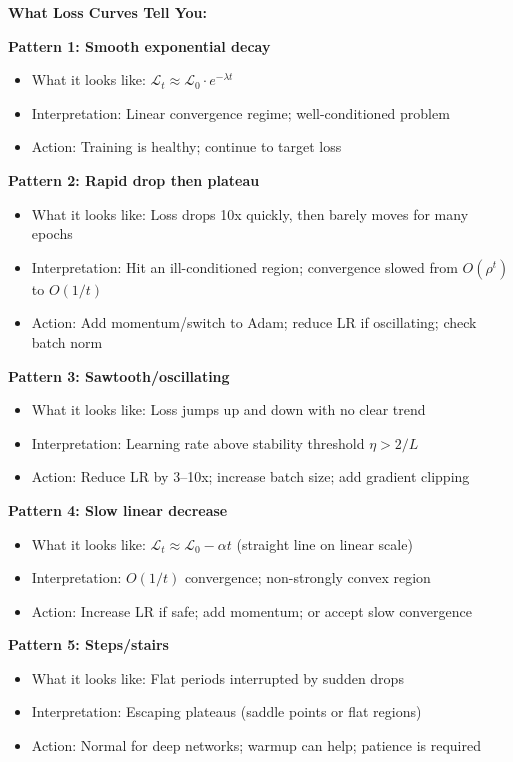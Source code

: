 \documentclass[../../main.tex]{subfiles}
\begin{document}
\begin{important}
\textbf{What Loss Curves Tell You:}

\textbf{Pattern 1: Smooth exponential decay}
\begin{itemize}
    \item What it looks like: $\mathcal{L}_t \approx \mathcal{L}_0 \cdot e^{-\lambda t}$
    \item Interpretation: Linear convergence regime; well-conditioned problem
    \item Action: Training is healthy; continue to target loss
\end{itemize}

\textbf{Pattern 2: Rapid drop then plateau}
\begin{itemize}
    \item What it looks like: Loss drops 10x quickly, then barely moves for many epochs
    \item Interpretation: Hit an ill-conditioned region; convergence slowed from $O(\rho^t)$ to $O(1/t)$
    \item Action: Add momentum/switch to Adam; reduce LR if oscillating; check batch norm
\end{itemize}

\textbf{Pattern 3: Sawtooth/oscillating}
\begin{itemize}
    \item What it looks like: Loss jumps up and down with no clear trend
    \item Interpretation: Learning rate above stability threshold $\eta > 2/L$
    \item Action: Reduce LR by 3--10x; increase batch size; add gradient clipping
\end{itemize}

\textbf{Pattern 4: Slow linear decrease}
\begin{itemize}
    \item What it looks like: $\mathcal{L}_t \approx \mathcal{L}_0 - \alpha t$ (straight line on linear scale)
    \item Interpretation: $O(1/t)$ convergence; non-strongly convex region
    \item Action: Increase LR if safe; add momentum; or accept slow convergence
\end{itemize}

\textbf{Pattern 5: Steps/stairs}
\begin{itemize}
    \item What it looks like: Flat periods interrupted by sudden drops
    \item Interpretation: Escaping plateaus (saddle points or flat regions)
    \item Action: Normal for deep networks; warmup can help; patience is required
\end{itemize}


\end{important}
\end{document}
